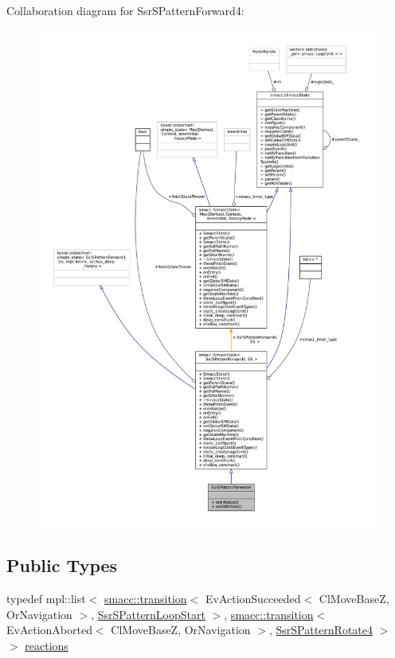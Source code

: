 Collaboration diagram for Ssr\+S\+Pattern\+Forward4\+:
\nopagebreak
\begin{figure}[H]
\begin{center}
\leavevmode
\includegraphics[width=350pt]{structSsrSPatternForward4__coll__graph}
\end{center}
\end{figure}
\subsection*{Public Types}
\begin{DoxyCompactItemize}
\item 
typedef mpl\+::list$<$ \hyperlink{classsmacc_1_1transition}{smacc\+::transition}$<$ Ev\+Action\+Succeeded$<$ Cl\+Move\+BaseZ, Or\+Navigation $>$, \hyperlink{structSsrSPatternLoopStart}{Ssr\+S\+Pattern\+Loop\+Start} $>$, \hyperlink{classsmacc_1_1transition}{smacc\+::transition}$<$ Ev\+Action\+Aborted$<$ Cl\+Move\+BaseZ, Or\+Navigation $>$, \hyperlink{structSsrSPatternRotate4}{Ssr\+S\+Pattern\+Rotate4} $>$ $>$ \hyperlink{structSsrSPatternForward4_ab96215cb7af7a9dfe1dfad6a1f4979d5}{reactions}
\end{DoxyCompactItemize}
